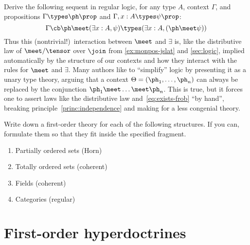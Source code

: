 \begin{ex}\label{ex:exists-frob}
  Derive the following sequent in regular logic, for any type $A$, context $\Gamma$, and propositions $\Gamma\types\ph\prop$ and $\Gamma,x:A\types\psi\prop$:
  \begin{equation}
    \Gamma \cb \ph\meet (\exists x:A,\psi) \types (\exists x:A, (\ph\meet\psi))\label{eq:exists-frob}
  \end{equation}
  Thus this (nontrivial!)\ interaction between $\meet$ and $\exists$ is, like the distributive law of $\meet/\tensor$ over $\join$ from \cref{ex:monpos-jslat} and \cref{sec:logic}, implied automatically by the structure of our contexts and how they interact with the rules for $\meet$ and $\exists$.
  Many authors like to ``simplify'' logic by presenting it as a unary type theory, arguing that a context $\Theta = (\ph_1,\dots,\ph_n)$ can always be replaced by the conjunction $\ph_1\meet \dots \meet\ph_n$.
  This is true, but it forces one to assert laws like the distributive law and~\eqref{eq:exists-frob} ``by hand'', breaking principle~\eqref{princ:independence} and making for a less congenial theory.
\end{ex}

\begin{ex}\label{ex:fol-egs}
  Write down a first-order theory for each of the following structures.
  If you can, formulate them so that they fit inside the specified fragment.
  \begin{enumerate}
  \item Partially ordered sets (Horn)
  \item Totally ordered sets (coherent)
  \item Fields (coherent)
  \item Categories (regular)
  \end{enumerate}
\end{ex}


\section{First-order hyperdoctrines}
\label{sec:hyperdoctrines}



